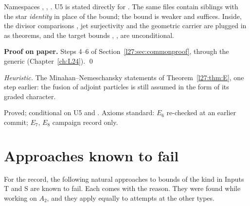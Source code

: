 \begin{dictionary}
Namespaces , , . U5 is stated directly for . The same files
contain siblings  with the star \emph{identity}  in place of the bound; the bound is weaker
and suffices. Inside, the divisor comparisons , jet surjectivity and the geometric carrier are plugged in as
theorems, and the target bounds , ,  are unconditional.
\end{dictionary}

\textbf{Proof on paper.} Steps 4--6 of Section~\ref{l27:sec:commonproof}, through the generic
 (Chapter~\ref{ch:L24}). \qed

\begin{physics}
\emph{Heuristic.} The Minahan--Nemeschansky statements of Theorem~\ref{l27:thm:E}, one step earlier: the fusion of adjoint particles is
still assumed in the form of its graded character.
\end{physics}

\begin{status}
Proved; conditional on U5 and . Axioms standard: $E_6$ re-checked at an earlier commit; $E_7$, $E_8$ campaign record
only.
\end{status}

\section{Approaches known to fail}\label{l27:sec:deadends}

For the record, the following natural approaches to bounds of the kind in Inputs T and S are known to fail. Each comes with the reason.
They were found while working on $A_2$, and they apply equally to attempts at the other types.

